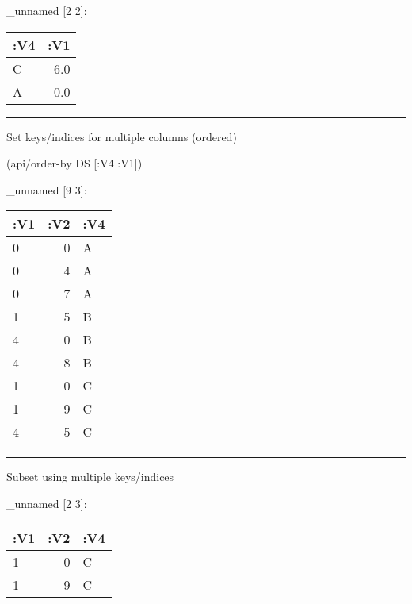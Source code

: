 \documentclass[]{article}
\newenvironment{Shaded}{\begin{snugshade}}{\end{snugshade}}
\newcommand{\KeywordTok}[1]{\textcolor[rgb]{0.13,0.29,0.53}{\textbf{#1}}}
\newcommand{\DecValTok}[1]{\textcolor[rgb]{0.00,0.00,0.81}{#1}}
\newcommand{\StringTok}[1]{\textcolor[rgb]{0.31,0.60,0.02}{#1}}
\newcommand{\VariableTok}[1]{\textcolor[rgb]{0.00,0.00,0.00}{#1}}
\newcommand{\AttributeTok}[1]{\textcolor[rgb]{0.77,0.63,0.00}{#1}}
\newcommand{\NormalTok}[1]{#1}
\begin{document}
\_unnamed {[}2 2{]}:

\begin{longtable}[]{@{}lr@{}}
\toprule
:V4 & :V1\tabularnewline
\midrule
\endhead
C & 6.0\tabularnewline
A & 0.0\tabularnewline
\bottomrule
\end{longtable}

\begin{center}\rule{0.5\linewidth}{0.5pt}\end{center}

Set keys/indices for multiple columns (ordered)

\begin{Shaded}
\begin{Highlighting}[]
\NormalTok{(api/order-by DS [}\AttributeTok{:V4} \AttributeTok{:V1}\NormalTok{])}
\end{Highlighting}
\end{Shaded}

\_unnamed {[}9 3{]}:

\begin{longtable}[]{@{}lrl@{}}
\toprule
:V1 & :V2 & :V4\tabularnewline
\midrule
\endhead
0 & 0 & A\tabularnewline
0 & 4 & A\tabularnewline
0 & 7 & A\tabularnewline
1 & 5 & B\tabularnewline
4 & 0 & B\tabularnewline
4 & 8 & B\tabularnewline
1 & 0 & C\tabularnewline
1 & 9 & C\tabularnewline
4 & 5 & C\tabularnewline
\bottomrule
\end{longtable}

\begin{center}\rule{0.5\linewidth}{0.5pt}\end{center}

Subset using multiple keys/indices

\begin{Shaded}
\end{Shaded}

\_unnamed {[}2 3{]}:

\begin{longtable}[]{@{}lrl@{}}
\toprule
:V1 & :V2 & :V4\tabularnewline
\midrule
\endhead
1 & 0 & C\tabularnewline
1 & 9 & C\tabularnewline
\bottomrule
\end{longtable}
\end{document}
